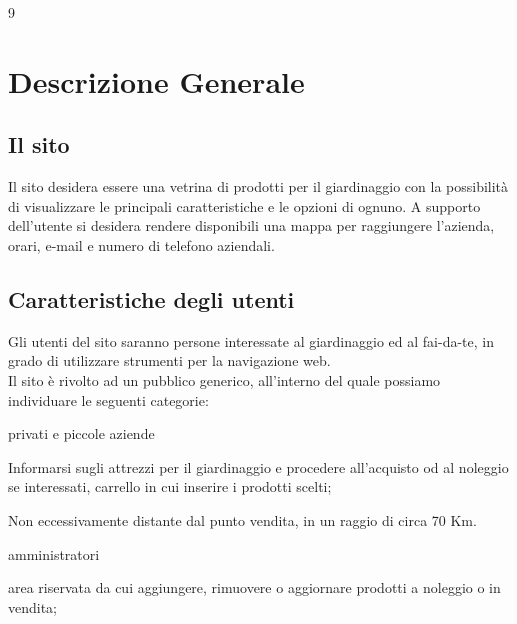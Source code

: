 9\section{Descrizione Generale}{
	\subsection{Il sito}{
		Il sito desidera essere una vetrina di prodotti per il giardinaggio con la possibilità di visualizzare le principali caratteristiche e le opzioni di ognuno.
		A supporto dell'utente si desidera rendere disponibili una mappa per raggiungere l'azienda, orari, e-mail e numero di telefono aziendali.
	}
	\subsection{Caratteristiche degli utenti}{
		Gli utenti del sito saranno persone interessate al giardinaggio ed al fai-da-te, in grado di utilizzare strumenti per la navigazione web. \\
		Il sito è rivolto ad un pubblico generico, all'interno del quale possiamo individuare le seguenti categorie:
		\begin{description}\itemsep1pt
			\item[Categoria di utenti:] privati e piccole aziende
			\begin{description}\itemsep1pt
				\item[Funzionalità:] Informarsi sugli attrezzi per il giardinaggio e procedere all'acquisto od al noleggio se interessati, carrello in cui inserire i prodotti scelti; 
				\item[Termini generali:] Non eccessivamente distante dal punto vendita, in un raggio di circa 70 Km.
			\end{description}
			\item[Categoria di utenti:] amministratori
			\begin{description}\itemsep1pt
				\item[Funzionalità:] area riservata da cui aggiungere, rimuovere o aggiornare prodotti a noleggio o in vendita;
			\end{description}
		\end{description}
	}
}
